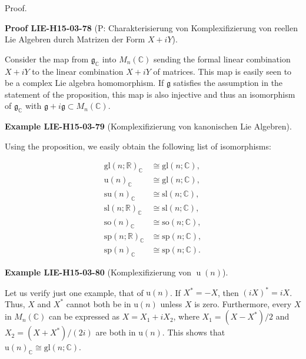 \documentclass[10pt, letterpaper]{article}
\newcommand{\CustomHeading}[3]{%
  \par\medskip\noindent%
  \textbf{#1 #2} \textnormal{(#3)}.\enskip%
}
\newenvironment{EXA}[2]{\begin{unitbox}\CustomHeading{Example}{#1}{#2}}{\end{unitbox}}
\newenvironment{PROOF}[2]{\begin{unitbox}\CustomHeading{Proof}{#1}{#2}}{\end{unitbox}}
\begin{document}
Proof. 

\begin{PROOF}{LIE-H15-03-78}{P: Charakterisierung von Komplexifizierung von reellen Lie Algebren durch Matrizen der Form $X+iY$}
Consider the map from $\mathfrak{g}_{\mathbb{C}}$ into $M_{n}(\mathbb{C})$ sending the formal linear combination $X+i Y$ to the linear combination $X+i Y$ of matrices. This map is easily seen to be a complex Lie algebra homomorphism. If $\mathfrak{g}$ satisfies the assumption in the statement of the proposition, this map is also injective and thus an isomorphism of $\mathfrak{g}_{\mathbb{C}}$ with $\mathfrak{g}+i \mathfrak{g} \subset M_{n}(\mathbb{C})$.
\end{PROOF}

\begin{EXA}{LIE-H15-03-79}{Komplexifizierung von kanonischen Lie Algebren}
Using the proposition, we easily obtain the following list of isomorphisms:

$$
\begin{aligned}
\mathrm{gl}(n ; \mathbb{R})_{\mathbb{C}} & \cong \mathrm{gl}(n ; \mathbb{C}), \\
\mathrm{u}(n)_{\mathbb{C}} & \cong \mathrm{gl}(n ; \mathbb{C}), \\
\mathrm{su}(n)_{\mathbb{C}} & \cong \mathrm{sl}(n ; \mathbb{C}), \\
\mathrm{sl}(n ; \mathbb{R})_{\mathbb{C}} & \cong \mathrm{sl}(n ; \mathbb{C}), \\
\mathrm{so}(n)_{\mathbb{C}} & \cong \mathrm{so}(n ; \mathbb{C}), \\
\mathrm{sp}(n ; \mathbb{R})_{\mathbb{C}} & \cong \mathrm{sp}(n ; \mathbb{C}), \\
\mathrm{sp}(n)_{\mathbb{C}} & \cong \mathrm{sp}(n ; \mathbb{C}) .
\end{aligned}
$$
\end{EXA}

\begin{EXA}{LIE-H15-03-80}{Komplexifizierung von $\operatorname{u}(n)$}
Let us verify just one example, that of $\mathrm{u}(n)$. If $X^{*}=-X$, then $(i X)^{*}=i X$. Thus, $X$ and $X^{*}$ cannot both be in $\mathrm{u}(n)$ unless $X$ is zero. Furthermore, every $X$ in $M_{n}(\mathbb{C})$ can be expressed as $X=X_{1}+i X_{2}$, where $X_{1}=\left(X-X^{*}\right) / 2$ and $X_{2}=\left(X+X^{*}\right) /(2 i)$ are both in $\mathrm{u}(n)$. This shows that $\mathrm{u}(n)_{\mathbb{C}} \cong \mathrm{gl}(n ; \mathbb{C})$.
\end{EXA}
\end{document}
